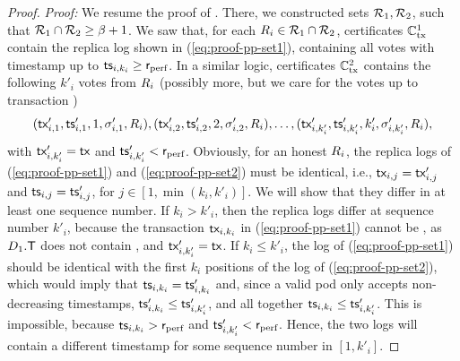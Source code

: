 \begin{proof}
	\noindent
	\emph{Proof:}
	We resume the proof of . There, we constructed sets $\mathcal{R}_1, \mathcal{R}_2$,
	such that $\allreps_1 \cap \allreps_2 \geq \beta + 1$.
	We saw that, for each $R_i \in \mathcal{R}_1 \cap \mathcal{R}_2$, certificates $\mathbb{C}_\text{tx}^1$ contain the replica log shown in (\ref{eq:proof-pp-set1}), containing all votes with timestamp up to $\textsf{ts}_{i, k_i} \geq \textsf{r}_\text{perf}$.
	In a similar logic, certificates $\mathbb{C}_\text{tx}^2$ contains the following $k'_i$ votes from $R_i$ (possibly more, but we care for the votes up to transaction \tx)
	\begin{equation}\label{eq:proof-pp-set2}
		(\textsf{tx}'_{i,1}, \textsf{ts}'_{i,1}, 1, \sigma'_{i,1}, R_i), (\textsf{tx}'_{i,2}, \textsf{ts}'_{i,2}, 2, \sigma'_{i,2}, R_i), \ldots, (\textsf{tx}'_{i, k'_i}, \textsf{ts}'_{i, k'_i}, k'_i, \sigma'_{i, k'_i}, R_i),
	\end{equation}
	with $\textsf{tx}'_{i, k'_i} = \textsf{tx}$ and $\textsf{ts}'_{i, k'_i} < \textsf{r}_\text{perf}$.
	Obviously, for an honest $R_i$, the replica logs of (\ref{eq:proof-pp-set1}) and (\ref{eq:proof-pp-set2}) must be identical, i.e., $\textsf{tx}_{i,j} = \textsf{tx}'_{i,j}$ and $\textsf{ts}_{i,j} = \textsf{ts}'_{i,j}$, for $j \in [ 1, \min(k_i, k'_i)]$.
	We will show that they differ in at least one sequence number.
	If $k_i > k'_i$, then the replica logs differ at sequence number $k'_i$, because the transaction $\textsf{tx}_{i, k_i}$ in (\ref{eq:proof-pp-set1}) cannot be \tx, as $D_1.\textsf{T}$ does not contain \tx, and $\textsf{tx}'_{i, k'_i} = \textsf{tx}$.
	If $k_i \leq k'_i$, the log of (\ref{eq:proof-pp-set1}) should be identical with the first $k_i$ positions of the log of (\ref{eq:proof-pp-set2}), which would imply that $\textsf{ts}_{i, k_i} = \textsf{ts}'_{i, k_i}$ and, since a valid pod only accepts non-decreasing timestamps, $\textsf{ts}'_{i, k_i} \leq \textsf{ts}'_{i, k'_i}$, and all together $\textsf{ts}_{i, k_i} \leq \textsf{ts}'_{i, k'_i}$.
	This is impossible, because $\textsf{ts}_{i, k_i} > \textsf{r}_\text{perf}$ and $\textsf{ts}'_{i, k'_i} < \textsf{r}_\text{perf}$.
	Hence, the two logs will contain a different timestamp for some sequence number in $[1, k'_i]$.


\end{proof}
